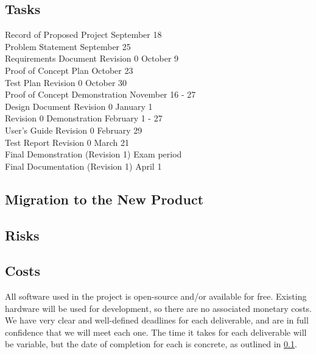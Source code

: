 \documentclass[12pt]{article}
\begin{document}
\subsection{Tasks}\label{SubSec_Tasks} %
Record of Proposed Project \hfill September 18\\
Problem Statement \hfill September 25\\
Requirements Document Revision 0 \hfill October 9\\
Proof of Concept Plan \hfill October 23\\
Test Plan Revision 0 \hfill October 30\\
Proof of Concept Demonstration \hfill November 16 - 27\\
Design Document Revision 0 \hfill January 1\\
Revision 0 Demonstration \hfill February 1 - 27\\
User's Guide Revision 0 \hfill February 29\\
Test Report Revision 0 \hfill March 21\\
Final Demonstration (Revision 1) \hfill Exam period\\
Final Documentation (Revision 1) \hfill April 1

\subsection{Migration to the New Product} %

\subsection{Risks} %

\subsection{Costs} %
All software used in the project is open-source and/or available for free. Existing hardware will be used for development, so there are no associated monetary costs.\\

We have very clear and well-defined deadlines for each deliverable, and are in full confidence that we will meet each one. The time it takes for each deliverable will be variable, but the date of completion for each is concrete, as outlined in \ref{SubSec_Tasks}.
\end{document}

